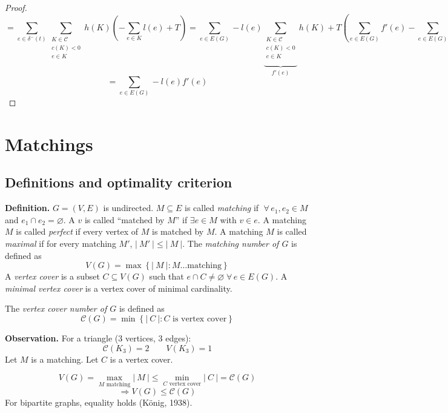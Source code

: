 \documentclass{article}
\newcommand{\card}[1]{\left|\:\!#1\:\!\right|}
\newcommand{\set}[1]{\left\{#1\right\}}
\newcommand{\fall}{\;\forall\,}
\begin{document}
\begin{proof}
\begin{equation*}
  \end{equation*} \begin{equation*}
      = \sum_{e \in \delta^-(t)} \sum_{\substack{K \in \mathcal{C} \\ c(K) < 0 \\ e \in K}} h(K) \left(
        -\sum_{e \in K} l(e) + T
      \right)
    = \sum_{e \in E(G)} -l(e) \underbrace{\sum_{\substack{K \in \mathcal{C} \\ c(K) < 0 \\ e \in K}}}_{f'(e)} h(K)
    + T \left(\sum_{e \in E(G)} f'(e) - \sum_{e \in E(G)} f'(e)\right)
  \end{equation*} \begin{equation*}
    = \sum_{e \in E(G)} -l(e) f'(e)
  \end{equation*}
\end{proof}

\section{Matchings}
%
\subsection{Definitions and optimality criterion}
%
\textbf{Definition.}
  $G=(V,E)$ is undirected. $M \subseteq E$ is called \emph{matching} if $\fall e_1, e_2 \in M$ and $e_1 \cap e_2 = \diameter$. A $v$ is called ``matched by $M$'' if $\exists e \in M$ with $v \in e$. A matching $M$ is called \emph{perfect} if every vertex of $M$ is matched by $M$. A matching $M$ is called \emph{maximal} if for every matching $M'$, $\card{M'} \leq \card{M}$. The \emph{matching number of $G$} is defined as
  \[ V(G) = \max\set{\card{M}: M \dots \text{matching}} \]
  A \emph{vertex cover} is a subset $C \subseteq V(G)$ such that $e \cap C \neq \diameter \fall e \in E(G)$.
  A \emph{minimal vertex cover} is a vertex cover of minimal cardinality.

  The \emph{vertex cover number of $G$} is defined as
  \[ \mathcal{C}(G) = \min\set{\card{C}: C \text{ is vertex cover}} \]

\textbf{Observation.}
  For a triangle (3 vertices, 3 edges):
  \[ \mathcal{C}(K_3) = 2 \qquad V(K_3) = 1 \]
  Let $M$ is a matching. Let $C$ is a vertex cover.

  \[
    V(G)
      =
        \max_{\text{$M$ matching}} \card{M} \leq \min_{\text{$C$ vertex cover}} \card{C}
      =
    \mathcal{C}(G)
  \] \[
    \Rightarrow V(G) \leq \mathcal{C}(G)
  \]
  For bipartite graphs, equality holds (König, 1938).
\end{document}

